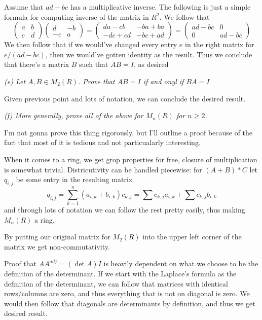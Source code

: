 \documentclass[11pt,oneside,titlepage]{book}
\begin{document}
Assume that $ad - bc$ has a multiplicative inverse. The following is
just a simple formula for computing inverse of the matrix in $R^2$. We
follow that
$$
\begin{pmatrix} a & b \\ c & d
\end{pmatrix}
\begin{pmatrix} d & -b \\ -c & a
\end{pmatrix} =
\begin{pmatrix} da - cb & -ba + ba \\ -dc + cd & -bc + ad
\end{pmatrix} =
\begin{pmatrix} ad - bc & 0 \\ 0 & ad - bc
\end{pmatrix}
$$
We then follow that if we would've changed every entry $e$ in the
right matrix for $e / (ad - bc)$, then we would've gotten identity as
the result. Thus we conclude that there's a matrix $B$ such that $AB =
I$, as desired

\textit{(e) Let $A, B \in M_2(R)$. Prove that $AB = I$ if and onyl if
$BA = I$}

Given previous point and lots of notation, we can conclude the desired
result.

\textit{(f) More generally, prove all of the above for $M_n(R)$ for $n
\geq 2$.}

I'm not gonna prove this thing rigorously, but I'll outline a proof
because of the fact that most of it is tedious and not particualarly
interesting.

When it comes to a ring, we get grop properties for free, closure of
multiplication is somewhat trivial. Districutivity can be handled
piecewise: for $(A + B) * C$ let $q_{i, j}$ be some entry in the
resulting matrix
$$q_{i, j} = \sum_{k = 1}^{n}{(a_{i, k} + b_{i, k}) c_{k, j} } =
\sum{c_{k, j}a_{i, k}} + \sum{c_{k, j}b_{i, k}}$$ and through lots of
notation we can follow the rest pretty easily, thus making $M_n(R)$ a
ring.

By putting our original matrix for $M_2(R)$ into the upper left corner
of the matrix we get non-commutativity.

Proof that $A A^{adj} = (\det A) I$ is heavily dependent on what we
choose to be the definition of the determinant. If we start with the
Laplace's formula as the definition of the determinant, we can follow
that matrices with identical rows/columns are zero, and thus
everything that is not on diagonal is zero. We would then follow that
diagonals are determinants by definition, and thus we get desired
result.
\end{document}
